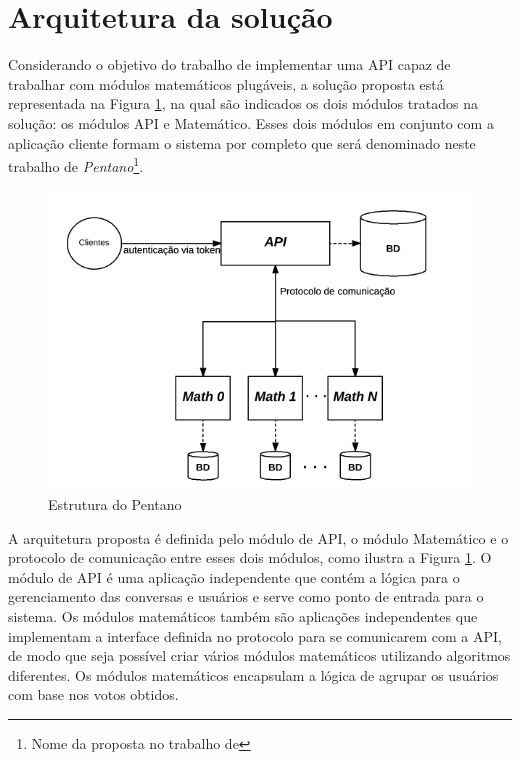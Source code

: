     

\section{Arquitetura da solução} \label{architecture}
    
    Considerando o objetivo do trabalho de implementar uma API capaz de trabalhar com 
    módulos matemáticos plugáveis, a solução proposta está representada na Figura \ref{fig:pentano}, 
    na qual são indicados os dois módulos tratados na solução: os módulos API e Matemático. Esses
    dois módulos em conjunto com a aplicação cliente formam o sistema por completo que será denominado neste trabalho
    de \textit{Pentano}\footnote{Nome da proposta no trabalho de }.
    
    \begin{figure}[h!]
    \centering
    \includegraphics[scale=0.7]{figuras/esquema_pentano.png}
    \caption{Estrutura do Pentano}
    \label{fig:pentano}
    \end{figure}
    
    A arquitetura proposta é definida pelo módulo de API, o módulo Matemático
    e o protocolo de comunicação entre esses dois módulos, como ilustra a Figura \ref{fig:pentano}. O módulo de 
    API é uma aplicação independente que contém a lógica para o gerenciamento das conversas e usuários e
    serve como ponto de entrada para o sistema. Os módulos matemáticos também são aplicações independentes que implementam a 
    interface definida no protocolo
    para se comunicarem com a API, de modo que seja possível criar vários módulos matemáticos utilizando algoritmos diferentes.
    Os módulos matemáticos encapsulam a lógica de agrupar os usuários com base nos votos obtidos.
    
